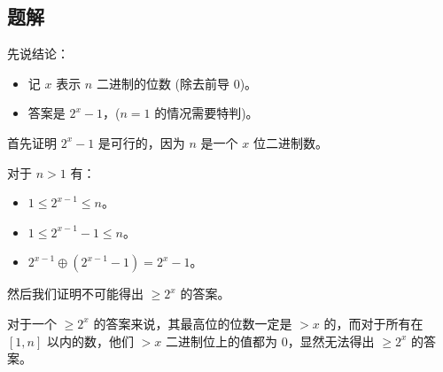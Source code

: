 \subsection{题解}
\begin{frame} %
先说结论：
\begin{itemize}
    \item 记 $x$ 表示 $n$ 二进制的位数 (除去前导 $0$)。
    \item 答案是 $2^x - 1$，($n = 1$ 的情况需要特判)。
\end{itemize}
\end{frame}


\begin{frame}

首先证明 $2^x - 1$ 是可行的，因为 $n$ 是一个 $x$ 位二进制数。

对于 $n > 1$ 有：
\begin{itemize}
    \item $1\leq 2^{x - 1}\leq n$。
    \item $1\leq 2^{x - 1} - 1\leq n$。
    \item $2^{x - 1} \oplus (2^{x - 1} - 1) = 2^x - 1$。
\end{itemize}

然后我们证明不可能得出 $\geq 2^x$ 的答案。

对于一个 $\geq 2^x$ 的答案来说，其最高位的位数一定是 $> x$ 的，而对于所有在 $[1,
n]$ 以内的数，他们 $>x$ 二进制位上的值都为 $0$，显然无法得出 $\geq 2^x$ 的答案。

\end{frame}
